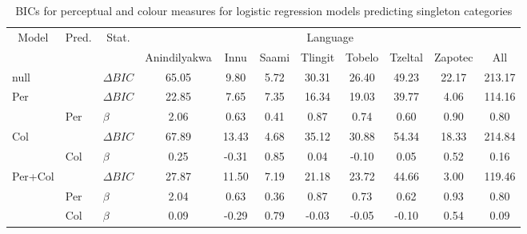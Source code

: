 \begin{table}[!h]
\centering
\caption{\label{tab:table:resultsLR}BICs for perceptual and colour measures for logistic regression models predicting singleton categories}
\centering
\begin{tabular}[t]{lllcccccccc}
\toprule
\multicolumn{1}{c}{Model} & \multicolumn{1}{c}{Pred.} & \multicolumn{1}{c}{Stat.} & \multicolumn{8}{c}{Language} \\
\cmidrule(l{3pt}r{3pt}){1-1} \cmidrule(l{3pt}r{3pt}){2-2} \cmidrule(l{3pt}r{3pt}){3-3} \cmidrule(l{3pt}r{3pt}){4-11}
  &    &     & Anindilyakwa & Innu & Saami & Tlingit & Tobelo & Tzeltal & Zapotec & All\\
\midrule
null &  & $\Delta BIC$ & 65.05 & 9.80 & 5.72 & 30.31 & 26.40 & 49.23 & 22.17 & 213.17\\
Per &  & $\Delta BIC$ & 22.85 & 7.65 & 7.35 & 16.34 & 19.03 & 39.77 & 4.06 & 114.16\\
 & Per & $\beta$ & 2.06 & 0.63 & 0.41 & 0.87 & 0.74 & 0.60 & 0.90 & 0.80\\
Col &  & $\Delta BIC$ & 67.89 & 13.43 & 4.68 & 35.12 & 30.88 & 54.34 & 18.33 & 214.84\\
 & Col & $\beta$ & 0.25 & -0.31 & 0.85 & 0.04 & -0.10 & 0.05 & 0.52 & 0.16\\
Per+Col &  & $\Delta BIC$ & 27.87 & 11.50 & 7.19 & 21.18 & 23.72 & 44.66 & 3.00 & 119.46\\
 & Per & $\beta$ & 2.04 & 0.63 & 0.36 & 0.87 & 0.73 & 0.62 & 0.93 & 0.80\\
 & Col & $\beta$ & 0.09 & -0.29 & 0.79 & -0.03 & -0.05 & -0.10 & 0.54 & 0.09\\
\bottomrule
\end{tabular}
\end{table}
